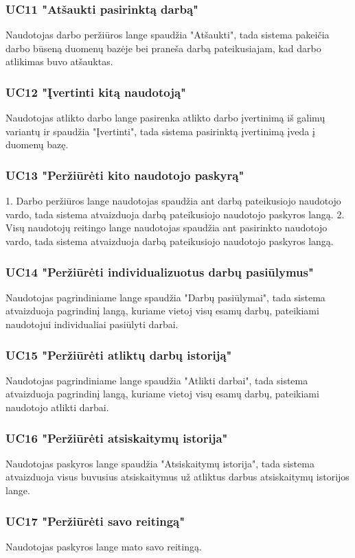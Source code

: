 \documentclass{VUMIFPSbakalaurinis}
\begin{document}
\subsubsection{UC11 "Atšaukti pasirinktą darbą"}
Naudotojas darbo peržiūros lange spaudžia "Atšaukti", tada sistema pakeičia darbo būseną duomenų bazėje bei praneša darbą pateikusiajam, kad darbo atlikimas buvo atšauktas.
\subsubsection{UC12 "Įvertinti kitą naudotoją"}
Naudotojas atlikto darbo lange pasirenka atlikto darbo įvertinimą iš galimų variantų ir spaudžia "Įvertinti", tada sistema pasirinktą įvertinimą įveda į duomenų bazę.
\subsubsection{UC13 "Peržiūrėti kito naudotojo paskyrą"}
1. Darbo peržiūros lange naudotojas spaudžia ant darbą pateikusiojo naudotojo vardo, tada sistema atvaizduoja darbą pateikusiojo naudotojo paskyros langą.
2. Visų naudotojų reitingo lange naudotojas spaudžia ant pasirinkto naudotojo vardo, tada sistema atvaizduoja darbą pateikusiojo naudotojo paskyros langą.
\subsubsection{UC14 "Peržiūrėti individualizuotus darbų pasiūlymus"}
Naudotojas pagrindiniame lange spaudžia "Darbų pasiūlymai", tada sistema atvaizduoja pagrindinį langą, kuriame vietoj visų esamų darbų, pateikiami naudotojui individualiai pasiūlyti darbai.
\subsubsection{UC15 "Peržiūrėti atliktų darbų istoriją"}
Naudotojas pagrindiniame lange spaudžia "Atlikti darbai", tada sistema atvaizduoja pagrindinį langą, kuriame vietoj visų esamų darbų, pateikiami naudotojo atlikti darbai. 
\subsubsection{UC16 "Peržiūrėti atsiskaitymų istorija"}
Naudotojas paskyros lange spaudžia "Atsiskaitymų istorija", tada sistema atvaizduoja visus buvusius  atsiskaitymus už atliktus darbus atsiskaitymų istorijos lange.
\subsubsection{UC17 "Peržiūrėti savo reitingą"}
Naudotojas paskyros lange mato savo reitingą.
\end{document}
